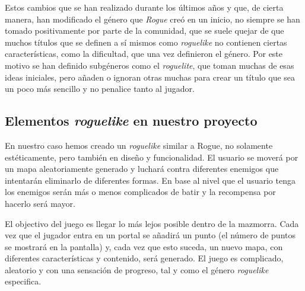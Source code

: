 Estos cambios que se han realizado durante los últimos años y que, de cierta manera, han modificado el género que \textit{Rogue} creó en un inicio, no siempre se han tomado positivamente por parte de la comunidad, que se suele quejar de que muchos títulos que se definen a sí mismos como \textit{roguelike} no contienen ciertas características, como la dificultad, que una vez definieron el género. Por este motivo se han definido subgéneros como el \textit{roguelite}, que toman muchas de esas ideas iniciales, pero añaden o ignoran otras muchas para crear un título que sea un poco más sencillo y no penalice tanto al jugador.

\subsection{Elementos \textit{roguelike} en nuestro proyecto}

En nuestro caso hemos creado un \textit{roguelike} similar a Rogue, no solamente estéticamente, pero también en diseño y funcionalidad. El usuario se moverá por un mapa aleatoriamente generado y luchará contra diferentes enemigos que intentarán eliminarlo de diferentes formas. En base al nivel que el usuario tenga los enemigos serán más o menos complicados de batir y la recompensa por hacerlo será mayor.

El objectivo del juego es llegar lo más lejos posible dentro de la mazmorra. Cada vez que el jugador entra en un portal se añadirá un punto (el número de puntos se mostrará en la pantalla) y, cada vez que esto suceda, un nuevo mapa, con diferentes características y contenido, será generado. El juego es complicado, aleatorio y con una sensación de progreso, tal y como el género \textit{roguelike} especifica.

